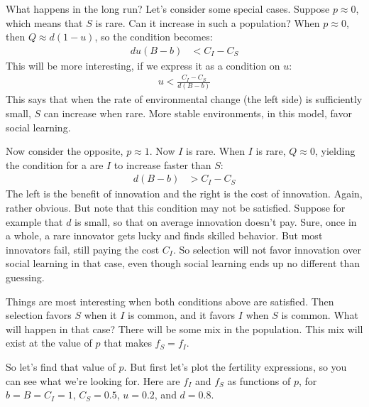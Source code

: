 \documentclass[10pt,reqno]{amsbook}
\numberwithin{equation}{chapter}
\begin{document}
What happens in the long run? Let's consider some special cases. Suppose $p \approx 0$, which means that $S$ is rare. Can it increase in such a population? When $p \approx 0$, then $Q \approx d(1-u)$, so the condition becomes:
\begin{align*}
	du(B-b) &< C_I - C_S
\end{align*}
This will be more interesting, if we express it as a condition on $u$:
\begin{align*}
	u < \frac{C_I - C_S}{d(B-b)}
\end{align*}
This says that when the rate of environmental change (the left side) is sufficiently small, $S$ can increase when rare. More stable environments, in this model, favor social learning.

Now consider the opposite, $p \approx 1$. Now $I$ is rare. When $I$ is rare, $Q \approx 0$, yielding the condition for a are $I$ to increase faster than $S$:
\begin{align*}
	d(B-b) &> C_I - C_S
\end{align*}
The left is the benefit of innovation and the right is the cost of innovation. Again, rather obvious. But note that this condition may not be satisfied. Suppose for example that $d$ is small, so that on average innovation doesn't pay. Sure, once in a whole, a rare innovator gets lucky and finds skilled behavior. But most innovators fail, still paying the cost $C_I$. So selection will not favor innovation over social learning in that case, even though social learning ends up no different than guessing. 

Things are most interesting when both conditions above are satisfied. Then selection favors $S$ when it $I$ is common, and it favors $I$ when $S$ is common. What will happen in that case? There will be some mix in the population. This mix will exist at the value of $p$ that makes $f_S=f_I$. 

So let's find that value of $p$. But first let's plot the fertility expressions, so you can see what we're looking for. Here are $f_I$ and $f_S$ as functions of $p$, for $b=B=C_I=1$, $C_S=0.5$, $u=0.2$, and $d=0.8$.
\end{document}
